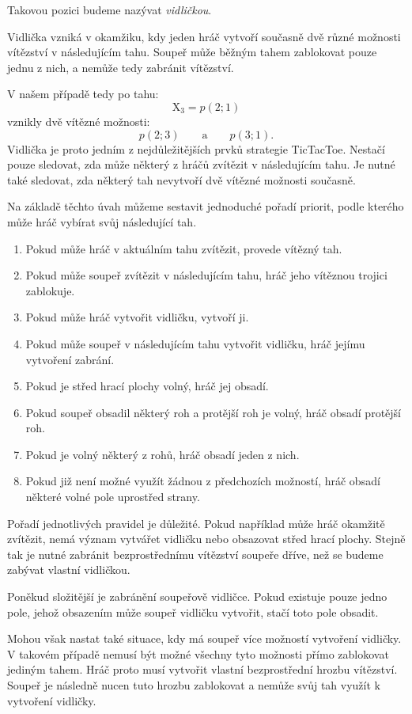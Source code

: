 \documentclass[12pt,a4paper]{article}
\begin{document}
Takovou pozici budeme nazývat \textit{vidličkou}.

Vidlička vzniká v okamžiku, kdy jeden hráč vytvoří současně dvě různé možnosti 
vítězství v následujícím tahu. Soupeř může běžným tahem zablokovat pouze jednu z nich,
a nemůže tedy zabránit vítězství.

V našem případě tedy po tahu:
\[
    \mathrm{X}_3=p(2;1)
\]
vznikly dvě vítězné možnosti:
\[
    p(2;3)
    \qquad\text{a}\qquad
    p(3;1).
\]
Vidlička je proto jedním z nejdůležitějších prvků strategie TicTacToe. 
Nestačí pouze sledovat, zda může některý z hráčů zvítězit v následujícím tahu. 
Je nutné také sledovat, zda některý tah nevytvoří dvě vítězné možnosti současně.

Na základě těchto úvah můžeme sestavit jednoduché pořadí priorit, 
podle kterého může hráč vybírat svůj následující tah.

\begin{enumerate}
    \item Pokud může hráč v aktuálním tahu zvítězit, provede vítězný tah.
    \item Pokud může soupeř zvítězit v následujícím tahu, hráč jeho vítěznou trojici zablokuje.
    \item Pokud může hráč vytvořit vidličku, vytvoří ji.
    \item Pokud může soupeř v následujícím tahu vytvořit vidličku, hráč jejímu vytvoření zabrání.
    \item Pokud je střed hrací plochy volný, hráč jej obsadí.
    \item Pokud soupeř obsadil některý roh a protější roh je volný, hráč obsadí protější roh.
    \item Pokud je volný některý z rohů, hráč obsadí jeden z nich.
    \item Pokud již není možné využít žádnou z předchozích možností, hráč obsadí některé volné pole uprostřed strany.
\end{enumerate}

Pořadí jednotlivých pravidel je důležité. Pokud například může hráč okamžitě zvítězit, 
nemá význam vytvářet vidličku nebo obsazovat střed hrací plochy. 
Stejně tak je nutné zabránit bezprostřednímu vítězství soupeře dříve, 
než se budeme zabývat vlastní vidličkou.

Poněkud složitější je zabránění soupeřově vidličce. 
Pokud existuje pouze jedno pole, jehož obsazením může soupeř vidličku vytvořit, 
stačí toto pole obsadit.

Mohou však nastat také situace, kdy má soupeř více možností vytvoření vidličky. 
V takovém případě nemusí být možné všechny tyto možnosti přímo zablokovat jediným tahem. 
Hráč proto musí vytvořit vlastní bezprostřední hrozbu vítězství. 
Soupeř je následně nucen tuto hrozbu zablokovat a nemůže svůj tah využít k vytvoření vidličky.
\end{document}
